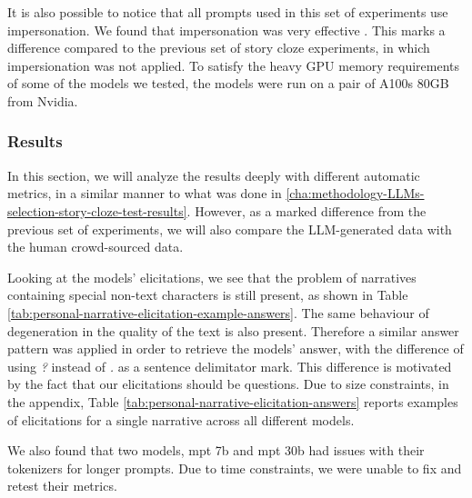 It is also possible to notice that all prompts used in this set of experiments use impersonation. We found that impersonation was very effective \cite{impersonation}. This marks a difference compared to the previous set of story cloze experiments, in which impersionation was not applied.
To satisfy the heavy GPU memory requirements of some of the models we tested, the models were run on a pair of A100s 80GB from Nvidia.
\subsubsection{Results}
\label{cha:methodology-personal-narrative-elicitation-results}
In this section, we will analyze the results deeply with different automatic metrics, in a similar manner to what was done in \ref{cha:methodology-LLMs-selection-story-cloze-test-results}. However, as a marked difference from the previous set of experiments, we will also compare the LLM-generated data with the human crowd-sourced data.


Looking at the models' elicitations, we see that the problem of narratives containing special non-text characters is still present, as shown in Table \ref{tab:personal-narrative-elicitation-example-answers}. The same behaviour of degeneration in the quality of the text is also present. Therefore a similar answer pattern was applied in order to retrieve the models' answer, with the difference of using \emph{?} instead of \emph{.} as a sentence delimitator mark. This difference is motivated by the fact that our elicitations should be questions.
% 
Due to size constraints, in the appendix, Table \ref{tab:personal-narrative-elicitation-answers} reports examples of elicitations for a single narrative across all different models. %

We also found that two models, mpt 7b and mpt 30b had issues with their tokenizers for longer prompts. Due to time constraints, we were unable to fix and retest their metrics.

